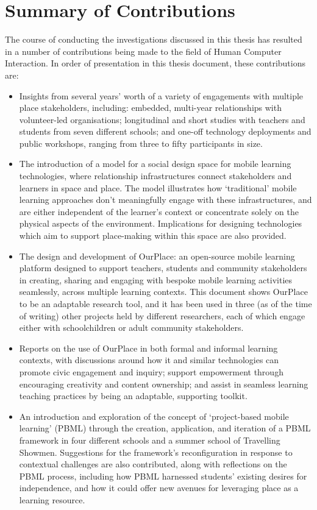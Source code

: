 \section{Summary of Contributions}
The course of conducting the investigations discussed in this thesis has resulted in a number of contributions being made to the field of Human Computer Interaction. In order of presentation in this thesis document, these contributions are:

\begin{itemize}
    \item Insights from several years' worth of a variety of engagements with multiple place stakeholders, including: embedded, multi-year relationships with volunteer-led organisations; longitudinal and short studies with teachers and students from seven different schools; and one-off technology deployments and public workshops, ranging from three to fifty participants in size.
    \item The introduction of a model for a social design space for mobile learning technologies, where relationship infrastructures connect stakeholders and learners in space and place. The model illustrates how `traditional' mobile learning approaches don’t meaningfully engage with these infrastructures, and are either independent of the learner’s context or concentrate solely on the physical aspects of the environment. Implications for designing technologies which aim to support place-making within this space are also provided.
    \item The design and development of OurPlace: an open-source mobile learning platform designed to support teachers, students and community stakeholders in creating, sharing and engaging with bespoke mobile learning activities seamlessly, across multiple learning contexts. This document shows OurPlace to be an adaptable research tool, and it has been used in three (as of the time of writing) other projects held by different researchers, each of which engage either with schoolchildren or adult community stakeholders.
    \item Reports on the use of OurPlace in both formal and informal learning contexts, with discussions around how it and similar technologies can promote civic engagement and inquiry; support empowerment through encouraging creativity and content ownership; and assist in seamless learning teaching practices by being an adaptable, supporting toolkit.
    \item An introduction and exploration of the concept of `project-based mobile learning' (PBML) through the creation, application, and iteration of a PBML framework in four different schools and a summer school of Travelling Showmen. Suggestions for the framework's reconfiguration in response to contextual challenges are also contributed, along with reflections on the PBML process, including how PBML harnessed students’ existing desires for independence, and how it could offer new avenues for leveraging place as a learning resource.

\end{itemize}
